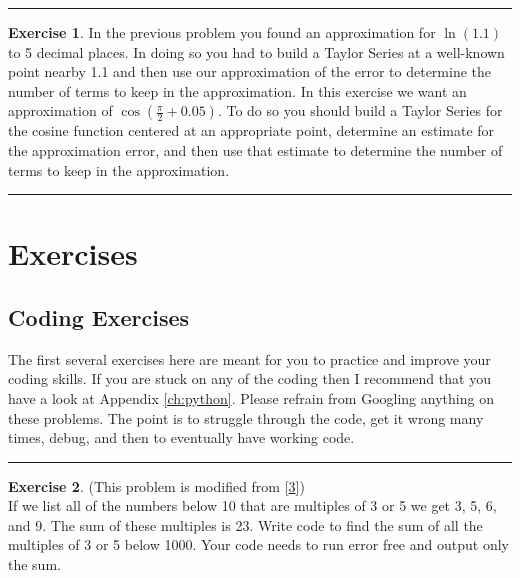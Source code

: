 \documentclass[
]{book}
\theoremstyle{definition}
\theoremstyle{definition}
\theoremstyle{definition}
\newtheorem{exercise}{Exercise}[chapter]
\theoremstyle{remark}
\begin{document}
\begin{center}\rule{0.5\linewidth}{0.5pt}\end{center}

\begin{exercise}
\protect\hypertarget{exr:unnamed-chunk-51}{}{\label{exr:unnamed-chunk-51} }In the previous problem you found an approximation for \(\ln(1.1)\) to 5 decimal places. In doing so you had to build a Taylor Series at a well-known point nearby 1.1 and then use our approximation of the error to determine the number of terms to keep in the approximation. In this exercise we want an approximation of \(\cos\left( \frac{\pi}{2} + 0.05 \right)\). To do so you should build a Taylor Series for the cosine function centered at an appropriate point, determine an estimate for the approximation error, and then use that estimate to determine the number of terms to keep in the approximation.
\end{exercise}

\begin{center}\rule{0.5\linewidth}{0.5pt}\end{center}

\hypertarget{exercises}{%
\section{Exercises}\label{exercises}}

\hypertarget{coding-exercises}{%
\subsection{Coding Exercises}\label{coding-exercises}}

The first several exercises here are meant for you to practice and
improve your coding skills. If you are stuck on any of the coding then I recommend that you have a look at Appendix \ref{ch:python}. Please refrain from Googling anything on these problems. The point is to struggle through the code, get it wrong many times, debug, and then to eventually have working code.

\begin{center}\rule{0.5\linewidth}{0.5pt}\end{center}

\begin{exercise}
\protect\hypertarget{exr:unnamed-chunk-52}{}{\label{exr:unnamed-chunk-52} }(This problem is modified from {[}\protect\hyperlink{ref-euler}{3}{]})\\
If we list all of the numbers below 10 that are multiples of 3 or 5 we
get 3, 5, 6, and 9. The sum of these multiples is 23. Write code to find
the sum of all the multiples of 3 or 5 below 1000. Your code needs to
run error free and output only the sum.
\end{exercise}
\end{document}
